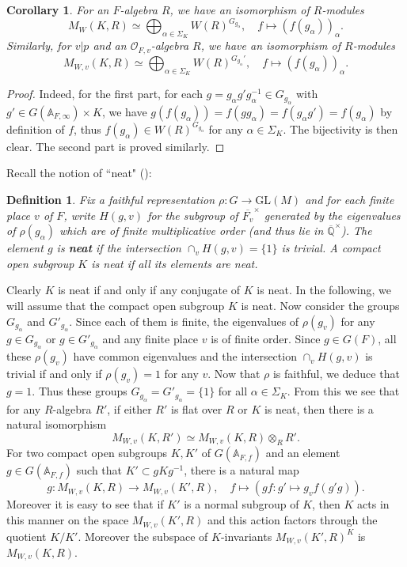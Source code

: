 \documentclass[12pt,oneside,reqno]{amsart}
\theoremstyle{plain}
\newtheorem{corollary}[theorem]{Corollary}
\newtheorem{definition}[theorem]{Definition}
\begin{document}
	
	\begin{corollary}\label{the space of modular forms is finite dimensional}
		For an $F$-algebra $R$,
		we have an isomorphism of
		$R$-modules
		\[
		M_W(K,R)
		\simeq
		\bigoplus_{\alpha\in\Sigma_K}
		W(R)^{G_{g_\alpha}},
		\quad
		f\mapsto
		(f(g_\alpha))_\alpha.
		\]
		Similarly,
		for $v |p$
		and an
		$\mathcal{O}_{F,v}$-algebra $R$,
		we have an isomorphism of $R$-modules
		\[
		M_{W,v}(K,R)
		\simeq
		\bigoplus_{\alpha\in\Sigma_K}
		W(R)^{G_{g_\alpha}'},
		\quad
		f\mapsto
		(f(g_\alpha))_\alpha.
		\]
	\end{corollary}
	\begin{proof}
		Indeed,
		for the first part,
		for each $g=g_\alpha g'g_\alpha^{-1}
		\in
		G_{g_\alpha}$
		with
		$g'\in
		G(\mathbb{A}_{F,\infty})\times K$,
		we have
		$g(f(g_\alpha))
		=
		f(gg_\alpha)
		=
		f(g_\alpha g')
		=
		f(g_\alpha)$
		by definition of $f$,
		thus
		$f(g_\alpha)
		\in
		W(R)^{G_{g_\alpha}}$
		for any $\alpha\in\Sigma_K$.
		The bijectivity is then clear. The second part is proved similarly.
	\end{proof}
	
	
	Recall the notion of ``neat" (\cite[Definition 1.4.1.8]{Lan2008}):
	\begin{definition}
		Fix a faithful representation
		$\rho
		\colon
		G\rightarrow
		\mathrm{GL}(M)$
		and for each finite place $v$ of $F$,
		write
		$H(g,v)$
		for the subgroup of
		$\overline{F_v}^\times$
		generated by the eigenvalues of
		$\rho(g_\alpha)$
		which are of finite multiplicative order
		(and thus lie in $\overline{\mathbb{Q}}^\times$).
		The element $g$ is
		\textbf{neat} if the intersection
		$\cap_vH(g,v)=\{1\}$
		is trivial.
		A compact open subgroup $K$ is
		neat if all its elements are neat.
	\end{definition}	
	Clearly $K$ is neat if and only if any conjugate of $K$ is neat. In the following, we will assume that the compact open subgroup
	$K$
	is neat.
	Now consider the groups
	$G_{g_\alpha}$ and
	$G'_{g_\alpha}$.
	Since each of them is finite,
	the eigenvalues of
	$\rho(g_v)$
	for any
	$g\in G_{g_\alpha}$
	or
	$g\in G'_{g_\alpha}$
	and any finite place
	$v$ is of finite order.
	Since
	$g\in G(F)$,
	all these $\rho(g_v)$
	have common eigenvalues and
	the intersection
	$\cap_vH(g,v)$
	is trivial if and only if
	$\rho(g_v)=1$
	for any $v$.
	Now that $\rho$ is faithful,
	we deduce that $g=1$.
	Thus  these groups
	$G_{g_\alpha}=G'_{g_\alpha}=\{1\}$
	for all $\alpha\in\Sigma_K$.
	From this we see that for any
	$R$-algebra $R'$,
	if either $R'$ is flat over $R$ or
	$K$ is neat, then
	there is a natural isomorphism
	\[
	M_{W,v}(K,R')
	\simeq
	M_{W,v}(K,R)
	\otimes_RR'.
	\]
	For two compact open subgroups
	$K,K'$ of
	$G(\mathbb{A}_{F,f})$
	and an element
	$g\in
	G(\mathbb{A}_{F,f})$
	such that
	$K'\subset gKg^{-1}$,
	there is a natural map
	\[
	g
	\colon
	M_{W,v}(K,R)
	\rightarrow
	M_{W,v}(K',R),
	\quad
	f\mapsto
	(gf\colon
	g'
	\mapsto
	g_vf(g'g)
	).
	\]
	Moreover it is easy to see that
	if $K'$ is a normal subgroup of
	$K$,
	then
	$K$ acts in this manner on the space
	$M_{W,v}(K',R)$
	and this action factors through
	the quotient
	$K/K'$.
	Moreover
	the subspace of
	$K$-invariants
	$M_{W,v}(K',R)^K$
	is 
	$M_{W,v}(K,R)$.
	
\end{document}
